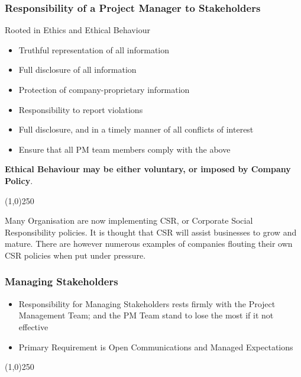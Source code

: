 \begin{frame}
\frametitle{Responsibility of a Project Manager to Stakeholders}
Rooted in Ethics and Ethical Behaviour\\
\begin{itemize}
\item Truthful representation of all information
\item Full disclosure of all information
\item Protection of company-proprietary information
\item Responsibility to report violations
\item Full disclosure, and in a timely manner of all conflicts of interest
\item Ensure that all PM team members comply with the above
\end{itemize}
\textbf{Ethical Behaviour may be either voluntary, or imposed by Company Policy}.\\
\end{frame}
\begin{center}\line(1,0){250}\end{center}
Many Organisation are now implementing CSR, or Corporate Social Responsibility policies.  It is thought that CSR will assist businesses to grow and mature.  There are however numerous examples of companies flouting their own CSR policies when put under pressure.




\begin{frame}
\frametitle{Managing Stakeholders}
\begin{itemize}
	\item Responsibility for Managing Stakeholders rests firmly with the Project Management Team; and the PM Team stand to lose the most if it not effective
	\item Primary Requirement is Open Communications and Managed Expectations
\end{itemize}
\end{frame}
\begin{center}\line(1,0){250}\end{center}



